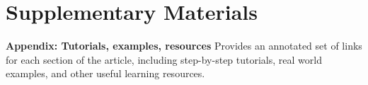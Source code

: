 \documentclass[12pt]{article}
\begin{document}
\section{Supplementary Materials}\label{supplementary-materials}

\textbf{Appendix: Tutorials, examples, resources} Provides an annotated
set of links for each section of the article, including step-by-step
tutorials, real world examples, and other useful learning resources.



\end{document}
